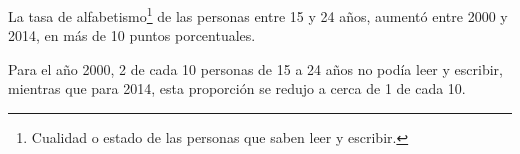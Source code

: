 La tasa de alfabetismo\footnote{Cualidad o estado de las personas que saben leer y escribir.} de las personas entre 15 y 24 años, aumentó entre 2000 y 2014, en más de 10 puntos porcentuales. 

Para el año 2000, 2 de cada 10 \mbox{personas} de 15 a 24 años no podía leer y escribir, mientras que para 2014, esta proporción se redujo a cerca de 1 de cada 10.